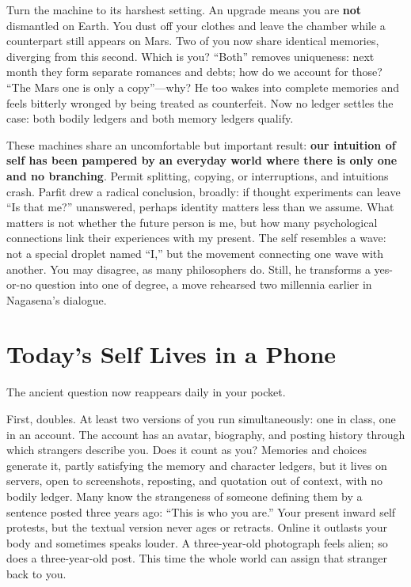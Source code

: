 Turn the machine to its harshest setting. An upgrade means you are \textbf{not} dismantled on Earth. You dust off your clothes and leave the chamber while a counterpart still appears on Mars. Two of you now share identical memories, diverging from this second. Which is you? ``Both'' removes uniqueness: next month they form separate romances and debts; how do we account for those? ``The Mars one is only a copy''---why? He too wakes into complete memories and feels bitterly wronged by being treated as counterfeit. Now no ledger settles the case: both bodily ledgers and both memory ledgers qualify.

These machines share an uncomfortable but important result: \textbf{our intuition of self has been pampered by an everyday world where there is only one and no branching}. Permit splitting, copying, or interruptions, and intuitions crash. Parfit drew a radical conclusion, broadly: if thought experiments can leave ``Is that me?'' unanswered, perhaps identity matters less than we assume. What matters is not whether the future person is me, but how many psychological connections link their experiences with my present. The self resembles a wave: not a special droplet named ``I,'' but the movement connecting one wave with another. You may disagree, as many philosophers do. Still, he transforms a yes-or-no question into one of degree, a move rehearsed two millennia earlier in Nagasena's dialogue.

\section{Today's Self Lives in a Phone}
The ancient question now reappears daily in your pocket.

First, doubles. At least two versions of you run simultaneously: one in class, one in an account. The account has an avatar, biography, and posting history through which strangers describe you. Does it count as you? Memories and choices generate it, partly satisfying the memory and character ledgers, but it lives on servers, open to screenshots, reposting, and quotation out of context, with no bodily ledger. Many know the strangeness of someone defining them by a sentence posted three years ago: ``This is who you are.'' Your present inward self protests, but the textual version never ages or retracts. Online it outlasts your body and sometimes speaks louder. A three-year-old photograph feels alien; so does a three-year-old post. This time the whole world can assign that stranger back to you.


